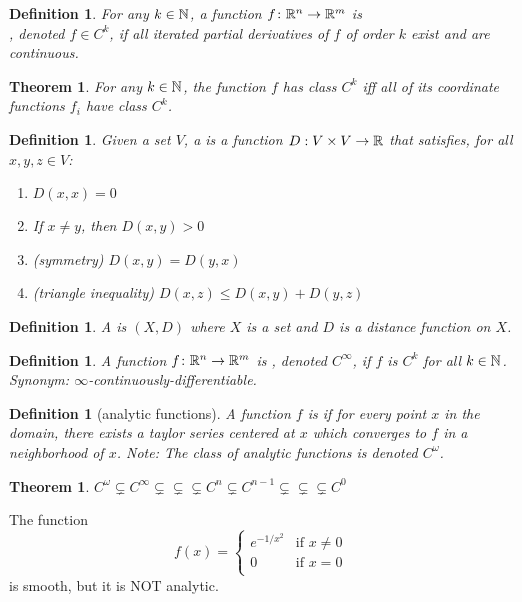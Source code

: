 \documentclass[11pt]{amsbook}
\theoremstyle{mystyle} %
\newtheorem{thrm}[thm]{Theorem}
\newtheorem{defi}[thm]{Definition}
\numberwithin{thm}{section}
\begin{document}
\begin{defi}
	For any $k \in {\mathbb N}$, a function $f\colon {\mathbb R}^n \to {\mathbb R}^m$ is \\, denoted $f \in C^k$, if all iterated partial derivatives of $f$ of order $k$ exist and are continuous.
\end{defi}
\begin{thrm}
	For any $k \in {\mathbb N}$, the function $f$ has class $C^k$ iff all of its coordinate functions $f_i$ have class $C^k$.
\end{thrm}
\begin{defi}
	Given a set $V$, a  is a function $D : V \times V \to {\mathbb R}$ that satisfies, for all $x, y, z \in V$:
	\begin{enumerate}
		\item $D(x,x) = 0$
		\item If $x \neq y$, then $D(x,y) > 0$
		\item (symmetry) $D(x,y) = D(y,x)$
		\item (triangle inequality) $D(x,z) \leq D(x,y) + D(y,z)$
	\end{enumerate}
\end{defi}
\begin{defi}
	A  is $(X, D)$ where $X$ is a set and $D$ is a distance function on $X$.
\end{defi}
\begin{defi}
	A function $f\colon {\mathbb R}^n \to {\mathbb R}^m$ is , denoted $C^\infty$, if $f$ is $C^k$ for all $k \in {\mathbb N}$.
	Synonym: $\infty$-continuously-differentiable.
\end{defi}
\begin{defi}[analytic functions]
	A function $f$ is  if for every point $x$ in the domain, there exists a taylor series centered at $x$ which converges to $f$ in a neighborhood of $x$.  Note: The class of analytic functions is denoted $C^\omega$.
\end{defi}
\begin{thrm}
	$C^\omega \subsetneq C^\infty \subsetneq \subsetneq \subsetneq C^n \subsetneq C^{n-1} \subsetneq \subsetneq \subsetneq C^0$
\end{thrm}
\begin{example}
	The function $$f(x) =
	\begin{cases}
		e^{-1/x^2}	&\text{if $x \neq 0$} \\
		0			&\text{if $x=0$} \\
	\end{cases}
	$$
	is smooth, but it is NOT analytic.
\end{example}
\end{document}
